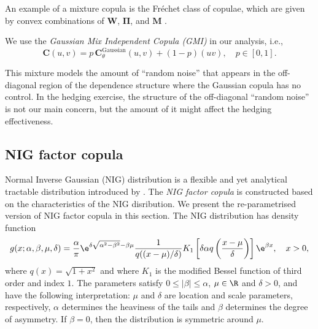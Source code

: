 
An example of a mixture copula is the Fr\'echet class of copulae, which
are given by convex combinations of $\bm{W}$, $\bm{\Pi}$, and $\bm{M}$
\citep{Nelsen1999}.  

We use the {\em Gaussian Mix Independent Copula (GMI)} in our analysis,
i.e., 
\begin{equation*}
  \bm{C}(u,v) = p\, \bm{C}^\text{Gaussian}_\theta (u,v) + (1-p)(uv),\quad p\in [0,1].
\end{equation*}

This mixture models the amount of ``random noise'' that appears in the
off-diagonal region of the dependence structure where the Gaussian copula has no control.
In the hedging exercise, the structure of the off-diagonal ``random noise'' is not our main concern, 
but the amount of it might affect the hedging effectiveness.
\natp{\em [Good!]}

\subsection{NIG factor copula}

Normal Inverse Gaussian (NIG) distribution is a flexible and yet analytical tractable distribution introduced by
\citep{BarndorffNielsen1997}.
The {\em NIG factor copula} is constructed based on the characteristics of the NIG disribution. 
We present the re-parametrised  version of NIG factor copula in this section.
The NIG distribution has density function
\begin{equation*}
  g(x; \alpha,\beta, \mu, \delta) = \frac{\alpha}{\pi} \e^{\delta
    \sqrt{\alpha^2-\beta^2} -\beta\mu} \frac{1}{q((x-\mu)/\delta)}
  K_1\left[\delta \alpha q\left(\frac{x-\mu}{\delta}\right) \right]
  \e^{\beta x},\quad x>0,
\end{equation*}
where $q(x) = \sqrt{1+x^2}$ and where $K_1$ is the modified Bessel
function of third order and index $1$. The parameters satisfy $0\leq
|\beta|\leq \alpha$, $\mu\in \R$ and $\delta>0$, and have
the following interpretation: $\mu$ and $\delta$ are location and
scale parameters, respectively, $\alpha$ determines the heaviness of
the tails and $\beta$ determines the degree of asymmetry. If
$\beta=0$, then the distribution is symmetric around $\mu$.

